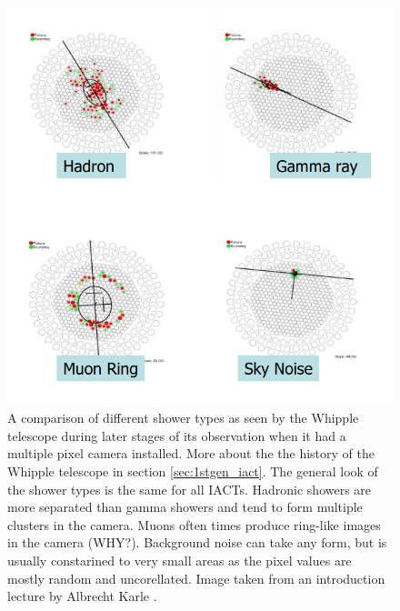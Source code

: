 \begin{figure}
	\centering
	\includegraphics[width=.5\textwidth]{images/shower_types.png}
	\caption{A comparison of different shower types as seen 
	by the Whipple telescope during later stages of its observation
	when it had a multiple pixel camera installed.
	More about the the history of the Whipple telescope in section
	\ref{sec:1stgen_iact}. The general look of the shower types 
	is the same for all IACTs.
	Hadronic showers are more separated than gamma showers and tend to
	form multiple clusters in the camera.
	Muons often times produce ring-like images in the camera (WHY?).
	Background noise can take any form, but is usually constarined to very small
	areas as the pixel values are mostly random and uncorellated. 	
	Image taken from an introduction lecture by Albrecht Karle \cite{icecube_showers}.}
	\label{fig:compare_showers}
\end{figure}
